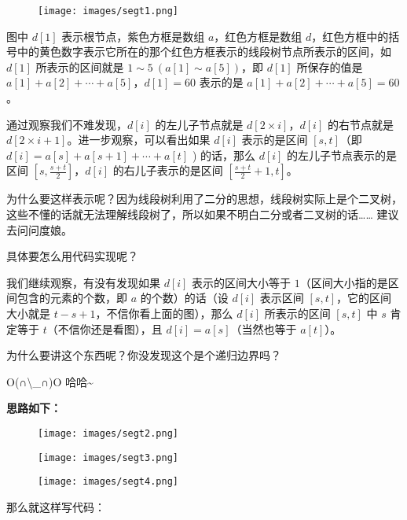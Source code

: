 \begin{figure}[h]
\centering
\texttt{[image: images/segt1.png]} 

\end{figure}

图中 $d[1]$ 表示根节点，紫色方框是数组 $a$，红色方框是数组 $d$，红色方框中的括号中的黄色数字表示它所在的那个红色方框表示的线段树节点所表示的区间，如 $d[1]$ 所表示的区间就是 $1\sim 5\ (a[1]\sim a[5])$，即 $d[1]$ 所保存的值是 $a[1]+a[2]+ \cdots +a[5]$，$d[1]=60$ 表示的是 $a[1]+a[2]+ \cdots +a[5]=60$。

通过观察我们不难发现，$d[i]$ 的左儿子节点就是 $d[2\times i]$，$d[i]$ 的右节点就是 $d[2\times i+1]$。进一步观察，可以看出如果 $d[i]$ 表示的是区间 $[s,t]$（即 $d[i]=a[s]+a[s+1]+ \cdots +a[t]$ ) 的话，那么 $d[i]$ 的左儿子节点表示的是区间 $[s, \frac{s+t}{2} ]$，$d[i]$ 的右儿子表示的是区间 $[ \frac{s+t}{2} +1,t]$。

为什么要这样表示呢？因为线段树利用了二分的思想，线段树实际上是个二叉树，这些不懂的话就无法理解线段树了，所以如果不明白二分或者二叉树的话…… 建议去问问度娘。

具体要怎么用代码实现呢？

我们继续观察，有没有发现如果 $d[i]$ 表示的区间大小等于 $1$（区间大小指的是区间包含的元素的个数，即 $a$ 的个数）的话（设 $d[i]$ 表示区间 $[s,t]$，它的区间大小就是 $t-s+1$，不信你看上面的图），那么 $d[i]$ 所表示的区间 $[s,t]$ 中 $s$ 肯定等于 $t$（不信你还是看图），且 $d[i]=a[s]$（当然也等于 $a[t]$）。

为什么要讲这个东西呢？你没发现这个是个递归边界吗？

O(∩\textbackslash{}\_∩)O 哈哈\textasciitilde{}

\textbf{ 思路如下：}

\begin{figure}[h]
\centering
\texttt{[image: images/segt2.png]} 

\end{figure}

\begin{figure}[h]
\centering
\texttt{[image: images/segt3.png]} 

\end{figure}

\begin{figure}[h]
\centering
\texttt{[image: images/segt4.png]} 

\end{figure}

那么就这样写代码：


